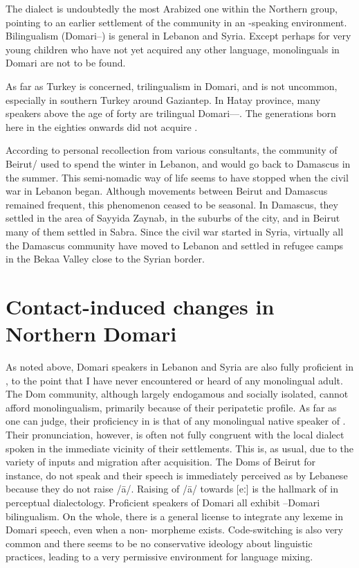 \documentclass[output=paper]{langsci/langscibook}
\begin{document}
The  dialect is undoubtedly the most Arabized one within the Northern group, pointing to an earlier settlement of the community in an -speaking environment. Bilingualism (Domari--) is general in Lebanon and Syria. Except perhaps for very young children who have not yet acquired any other language, monolinguals in Domari are not to be found.

As far as Turkey is concerned, trilingualism in Domari,  and  is not uncommon, especially in southern Turkey around Gaziantep. In Hatay province, many speakers above the age of forty are trilingual Domari----. The generations born here in the eighties onwards did not acquire . 

According to personal recollection from various consultants, the community of Beirut/ used to spend the winter in Lebanon, and would go back to Damascus in the summer. This semi-nomadic way of life seems to have stopped when the civil war in Lebanon began. Although movements between Beirut and Damascus remained frequent, this phenomenon ceased to be seasonal. In Damascus, they settled in the area of Sayyida Zaynab, in the suburbs of the city, and in Beirut many of them settled in Sabra. Since the civil war started in Syria, virtually all the Damascus community have moved to Lebanon and settled in refugee camps in the Bekaa Valley close to the Syrian border. 

\section{Contact-induced changes in Northern Domari}

As noted above, Domari speakers in Lebanon and Syria are also fully proficient in , to the point that I have never encountered or heard of any {monolingual} adult. The Dom community, although largely endogamous and socially isolated, cannot afford monolingualism, primarily because of their peripatetic profile. As far as one can judge, their proficiency in  is that of any {monolingual} native speaker of . Their pronunciation, however, is often not fully congruent with the local dialect spoken in the immediate vicinity of their settlements. This is, as usual, due to the variety of inputs and migration after acquisition. The Doms of Beirut for instance, do not speak   and their speech is immediately perceived as  by {Lebanese} because they do not raise /ā/. Raising of /ā/ towards [eː] is the hallmark of   in perceptual dialectology. Proficient speakers of Domari all exhibit --Domari {bilingualism}. On the whole, there is a general license to integrate any  lexeme in Domari speech, even when a non- morpheme exists. Code-switching is also very common and there seems to be no conservative ideology about linguistic practices, leading to a very permissive environment for language mixing.
\end{document}
